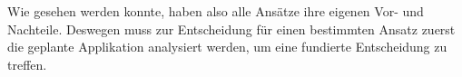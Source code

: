 Wie gesehen werden konnte, haben also alle Ansätze ihre eigenen Vor- und Nachteile. Deswegen muss zur Entscheidung für einen bestimmten Ansatz zuerst die geplante Applikation analysiert werden, um eine fundierte Entscheidung zu treffen.



